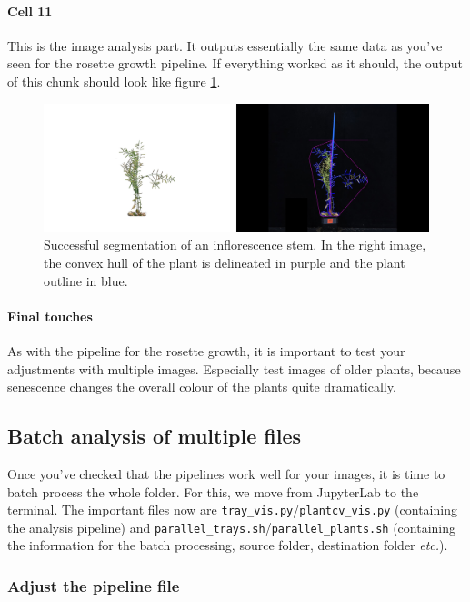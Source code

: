 \documentclass[10pt]{article}
\begin{document}
\paragraph*{Cell 11} This is the image analysis part. It outputs essentially the same data as you've seen for the rosette growth pipeline. If everything worked as it should, the output of this chunk should look like figure \ref{fig:inflorescence}.

\begin{figure}[!h]
	\centering
	\includegraphics[width=0.95\linewidth]{inflorescence}
	\caption[Successfully analysed inflorescence.]{Successful segmentation of an inflorescence stem. In the right image, the convex hull of the plant is delineated in purple and the plant outline in blue.}
	\label{fig:inflorescence}
\end{figure}

\paragraph*{Final touches} As with the pipeline for the rosette growth, it is important to test your adjustments with multiple images. Especially test images of older plants, because senescence changes the overall colour of the plants quite dramatically.

\subsection{Batch analysis of multiple files}

Once you've checked that the pipelines work well for your images, it is time to batch process the whole folder. For this, we move from JupyterLab to the terminal. The important files now are \texttt{tray\_vis.py}/\texttt{plantcv\_vis.py} (containing the analysis pipeline) and \texttt{parallel\_trays.sh}/\texttt{parallel\_plants.sh} (containing the information for the batch processing, source folder, destination folder \textit{etc.}). 

\subsubsection{Adjust the pipeline file}
\end{document}
